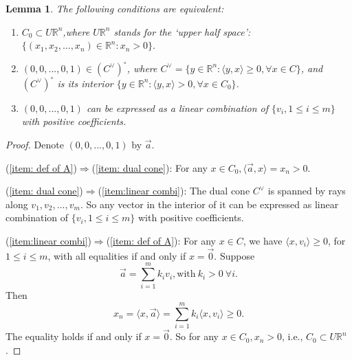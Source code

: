 \documentclass[12pt]{amsart}
\def\R {{\mathbb{R}}}
\newtheorem{lemma}[theorem]{Lemma}
\theoremstyle{definition}
\numberwithin{equation}{section}
\begin{document}
\begin{lemma}\label{lemma:equiva of Assu A}
The following conditions are equivalent: \begin{enumerate}
\item\label{item: def of A} $C_{0}\subset U\R^n$,where $U\R^n$ stands for the `upper half space': $\{(x_{1},x_{2},...,x_{n})\in
\R^n:x_{n}>0\}.$
\item\label{item: dual cone} $(0,0,...,0,1)\in (C^{\vee})^{\circ}$, where $C^{\vee}=\{y\in \R^n: \langle y, x\rangle \geq 0, \forall x\in
C\}$, and $(C^{\vee})^{\circ}$ is its interior $\{y\in \R^n: \langle
y, x\rangle > 0, \forall x\in C_{0}\}$.
\item\label{item:linear combi} $(0,0,...,0,1)$ can be expressed as a linear combination of $\{v_{i},1\leq i\leq
m\}$ with positive coefficients.
\end{enumerate}
\end{lemma}
\begin{proof}
Denote $(0,0,...,0,1)$ by $\vec{a}$.

(\ref{item: def of A})$\Rightarrow$(\ref{item: dual cone}): For any
$x\in C_{0}, \langle \vec{a}, x\rangle =x_{n}
> 0$.

(\ref{item: dual cone})$\Rightarrow$(\ref{item:linear combi}): The
dual cone $C^{\vee}$ is spanned by rays along
$v_{1},v_{2},...,v_{m}$. So any vector in the interior of it can be
expressed as linear combination of $\{v_{i},1\leq i\leq m\}$ with
positive coefficients.

(\ref{item:linear combi})$\Rightarrow$(\ref{item: def of A}): For
any $x\in C$, we have $\langle x, v_{i}\rangle \geq 0$, for $1\leq
i\leq m$, with all equalities if and only if $x=\vec{0}$. Suppose
\begin{equation*}
\vec{a}=\sum_{i=1}^{m}k_{i}v_{i}, \mbox{with}\ k_{i}>0\ \forall
i.\end{equation*} Then \begin{equation*}x_{n}=\langle x,
\vec{a}\rangle= \sum_{i=1}^{m}k_{i}\langle x, v_{i}\rangle \geq
0.\end{equation*} The equality holds if and only if $x=\vec{0}$. So
for any $x\in C_{0}, x_{n}>0$, i.e., $C_{0}\subset U\R^n$.
\end{proof}
\end{document}
